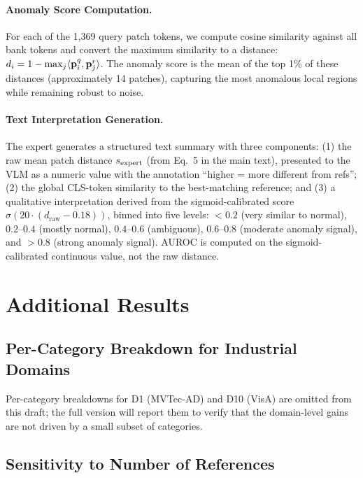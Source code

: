 \paragraph{Anomaly Score Computation.}
For each of the 1,369 query patch tokens, we compute cosine similarity against all bank tokens and convert the maximum similarity to a distance: $d_i = 1 - \max_{j} \langle \mathbf{p}_i^q, \mathbf{p}_j^r \rangle$. The anomaly score is the mean of the top 1\% of these distances (approximately 14 patches), capturing the most anomalous local regions while remaining robust to noise.

\paragraph{Text Interpretation Generation.}
The expert generates a structured text summary with three components: (1) the raw mean patch distance $s_{\text{expert}}$ (from Eq.~5 in the main text), presented to the VLM as a numeric value with the annotation ``higher = more different from refs''; (2) the global CLS-token similarity to the best-matching reference; and (3) a qualitative interpretation derived from the sigmoid-calibrated score $\sigma(20 \cdot (d_{\text{raw}} - 0.18))$, binned into five levels: $<0.2$ (very similar to normal), $0.2$--$0.4$ (mostly normal), $0.4$--$0.6$ (ambiguous), $0.6$--$0.8$ (moderate anomaly signal), and $>0.8$ (strong anomaly signal). AUROC is computed on the sigmoid-calibrated continuous value, not the raw distance.

\section{Additional Results}
\label{app:results}

\subsection{Per-Category Breakdown for Industrial Domains}

Per-category breakdowns for D1 (MVTec-AD) and D10 (VisA) are omitted from this draft; the full version will report them to verify that the domain-level gains are not driven by a small subset of categories.


\subsection{Sensitivity to Number of References}

